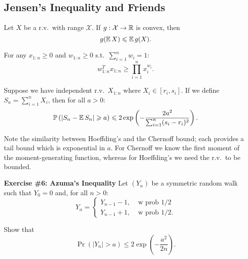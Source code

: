 \subsection{Jensen's Inequality and Friends}

\begin{theorem}
    Let $X$ be a r.v.\ with range $\mathcal{X}$.
    If $g: \mathcal{X} \rightarrow \mathbb R$ is convex, then 
    \[
        g(\operatorname*{\mathbb{E}} X)
        \leqslant 
        \operatorname*{\mathbb{E}} g(X).
    \]
\end{theorem}

\begin{theorem}
    For any $x_{1:n} \geq 0$ and $w_{1:n} \geq 0$ s.t.\ $\sum_{i=1}^{n} w_i = 1$:
    \[
        w_{1:n}^T x_{1:n}
        \geq
        \prod_{i=1}^{n} x_i^{w_i}.
    \] 
\end{theorem}

\begin{theorem}
    Suppose we have independent r.v.\ $X_{1:n}$ where $X_i \in [r_i, s_i]$.
    If we define $S_n = \sum_{i=1}^{n} X_i$, then for all $a > 0$:
    \[
        \operatorname*{\mathbb{P}} \left( | S_n - \operatorname*{\mathbb{E}} S_n| \geqslant a \right)
        \leqslant
        2 \exp \left( - \frac{2a^2}{ \sum_{i=1}^n (s_i-r_i)^2} \right).
    \]
\end{theorem}
 
Note the similarity between Hoeffding's and the Chernoff bound; each provides 
a tail bound which is exponential in $a$. For Chernoff we know the 
first moment of the moment-generating function, whereas for Hoeffding's 
we need the r.v.\ to be bounded.

\begin{tcolorbox}
    \textbf{Exercise \#6: Azuma's Inequality}
    Let $(Y_n)$ be a symmetric random walk such that $Y_0 = 0$ and, 
    for all $n > 0$:
    \[
        Y_n
        =
        \begin{cases}
            Y_{n-1} - 1, &\text{ w prob } 1/2 \\
            Y_{n-1} + 1, &\text{ w prob } 1/2.
        \end{cases}
    \]

    Show that 
    \[
        \Pr \left( |Y_n| > a \right)
        \leq 
        2 \exp \left( -\frac{a^2}{2n} \right).
    \]
\end{tcolorbox}

